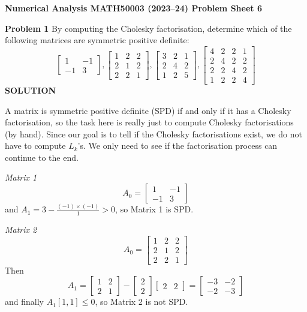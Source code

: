 \documentclass[12pt,a4paper]{article}
\def\endash{–}
\begin{document}
\textbf{Numerical Analysis MATH50003 (2023\ensuremath{\endash}24) Problem Sheet 6}

\textbf{Problem 1} By computing the Cholesky factorisation, determine which of the following matrices are symmetric positive definite:
\[
\begin{bmatrix} 1 & -1  \\
-1 & 3
\end{bmatrix}, \begin{bmatrix} 1 & 2 & 2  \\
2 & 1 & 2\\
2 & 2 & 1
\end{bmatrix}, \begin{bmatrix} 3 & 2 & 1  \\
2 & 4 & 2\\
1 & 2 & 5
\end{bmatrix},
\begin{bmatrix} 4 & 2 & 2 & 1  \\
2 & 4 & 2 & 2\\
2 & 2 & 4 & 2 \\
1 & 2 & 2 & 4
\end{bmatrix}
\]
\textbf{SOLUTION}

A matrix is symmetric positive definite (SPD) if and only if it has a Cholesky factorisation, so the task here is really just to compute Cholesky factorisations (by hand). Since our goal is to tell if the Cholesky factorisations exist, we do not have to compute $L_k$'s. We only need to see if the factorisation process can continue to the end.

\emph{Matrix 1}
\[
A_0=\begin{bmatrix} 1 & -1  \\
-1 & 3
\end{bmatrix}
\]
and     $A_1=3-\frac{(-1)\ensuremath{\times}(-1)}{1}>0$, so Matrix 1 is SPD.

\emph{Matrix 2}
\[
A_0=\begin{bmatrix}
1 & 2 & 2 \\
2 & 1 & 2 \\
2 & 2 & 1
\end{bmatrix}
\]
Then
\[
A_1=\begin{bmatrix}
1&2\\
2&1
\end{bmatrix}-\begin{bmatrix} 2 \\ 2 \end{bmatrix}\begin{bmatrix} 2 & 2 \end{bmatrix}=
\begin{bmatrix}
-3&-2\\
-2&-3
\end{bmatrix}
\]
and finally $A_1[1,1] \ensuremath{\leq} 0$, so Matrix 2 is not SPD.
\end{document}
